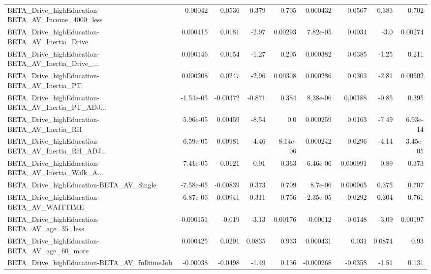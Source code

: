 \begin{tabular}{lrrrrrrrr}
BETA\_Drive\_highEducation-BETA\_AV\_Income\_4000\_less  &     0.00042 &       0.0536 &    0.379 &    0.705 &   0.000432 &      0.0567 &        0.383 &         0.702 \\
BETA\_Drive\_highEducation-BETA\_AV\_Inertia\_Drive     &    0.000415 &       0.0181 &    -2.97 &  0.00293 &   7.82e-05 &      0.0034 &         -3.0 &       0.00274 \\
BETA\_Drive\_highEducation-BETA\_AV\_Inertia\_Drive\_... &    0.000146 &       0.0154 &    -1.27 &    0.205 &   0.000382 &      0.0385 &        -1.25 &         0.211 \\
BETA\_Drive\_highEducation-BETA\_AV\_Inertia\_PT        &    0.000208 &       0.0247 &    -2.96 &  0.00308 &   0.000286 &      0.0303 &        -2.81 &       0.00502 \\
BETA\_Drive\_highEducation-BETA\_AV\_Inertia\_PT\_ADJ... &   -1.54e-05 &     -0.00372 &   -0.871 &    0.384 &   8.38e-06 &     0.00188 &        -0.85 &         0.395 \\
BETA\_Drive\_highEducation-BETA\_AV\_Inertia\_RH        &    5.96e-05 &      0.00459 &    -8.54 &      0.0 &   0.000259 &      0.0163 &        -7.49 &      6.93e-14 \\
BETA\_Drive\_highEducation-BETA\_AV\_Inertia\_RH\_ADJ... &    6.59e-05 &      0.00981 &    -4.46 & 8.14e-06 &   0.000242 &      0.0296 &        -4.14 &      3.45e-05 \\
BETA\_Drive\_highEducation-BETA\_AV\_Inertia\_Walk\_A... &   -7.41e-05 &      -0.0121 &     0.91 &    0.363 &  -6.46e-06 &   -0.000991 &         0.89 &         0.373 \\
BETA\_Drive\_highEducation-BETA\_AV\_Single            &   -7.58e-05 &     -0.00839 &    0.373 &    0.709 &    8.7e-06 &    0.000965 &        0.375 &         0.707 \\
BETA\_Drive\_highEducation-BETA\_AV\_WAITTIME          &   -6.87e-06 &     -0.00941 &    0.311 &    0.756 &  -2.35e-05 &     -0.0292 &        0.304 &         0.761 \\
BETA\_Drive\_highEducation-BETA\_AV\_age\_35\_less       &   -0.000151 &       -0.019 &    -3.13 &  0.00176 &   -0.00012 &     -0.0148 &        -3.09 &       0.00197 \\
BETA\_Drive\_highEducation-BETA\_AV\_age\_60\_more       &    0.000425 &       0.0291 &   0.0835 &    0.933 &   0.000431 &       0.031 &       0.0874 &          0.93 \\
BETA\_Drive\_highEducation-BETA\_AV\_fulltimeJob       &    -0.00038 &      -0.0498 &    -1.49 &    0.136 &  -0.000268 &     -0.0358 &        -1.51 &         0.131 \\

\end{tabular}
